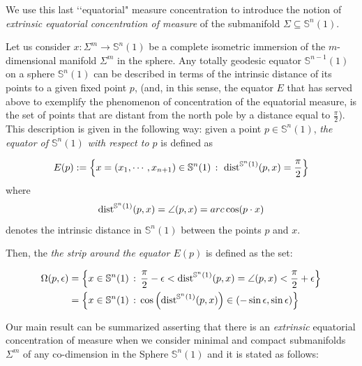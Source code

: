 \documentclass{amsart}
\theoremstyle{definition}
\theoremstyle{remark}
\begin{document}
We use this last \lq\lq equatorial" measure concentration to introduce the notion of  {\em extrinsic equatorial concentration of measure}  of the submanifold $\Sigma \subseteq \mathbb{S}^n(1)$. 

Let us consider $x: \Sigma^m \to \mathbb{S}^n(1)$ be a complete isometric immersion of the  $m$-dimensional manifold $\Sigma^m$ in the sphere. Any totally geodesic equator $\mathbb{S}^{n-1}(1)$ on a sphere  $\mathbb{S}^n(1)$ can be described in terms of the intrinsic distance of its points to a given fixed point $p$, (and, in this sense, the equator $E$ that has served above to exemplify the phenomenon of concentration of the equatorial measure, is the set of points that are distant from the north pole by a distance equal to $\frac{\pi}{2}$). This description is given in the following way: given a point $p \in \mathbb{S}^n(1)$, \emph{the equator of $\mathbb{S}^n(1)$ with respect to $p$} is defined as 
   
 $$
E(p):=\left\{x=(x_1,\cdots,x_{n+1})\in \mathbb{S}^n(1)\, :\,\,{\rm dist}^{\mathbb{S}^n(1)}(p,x)=\frac{\pi}{2} \right\}
    $$ \noindent where 
    $${\rm dist}^{\mathbb{S}^n(1)}(p,x)=\angle{(p,x)}=arc\cos(p\cdot x)$$
    \noindent  denotes the intrinsic distance in $\mathbb{S}^n(1)$ between the points $p$ and $x$. 
    
     Then, the  \emph{the strip around the equator $E(p)$} is defined as the set:
    

$$
\begin{aligned}
\Omega(p,\epsilon)&=\left\lbrace x\in \mathbb{S}^{n}(1)\, : \, \frac{\pi}{2}-\epsilon<{\rm dist}^{\mathbb{S}^{n}(1)}(p,x)=\angle{(p,x)}<\frac{\pi}{2}+\epsilon\right\rbrace\\&=\left\lbrace x\in \mathbb{S}^{n}(1)\, : \,   \cos\left({\rm dist}^{\mathbb{S}^{n}(1)}(p,x)\right)\in ( -\sin\epsilon,\sin\epsilon) \right\rbrace
\end{aligned}
$$

Our main result can be summarized asserting that there is an {\em extrinsic} equatorial concentration of measure when we consider minimal and compact submanifolds $\Sigma^m$ of any co-dimension in the Sphere $\mathbb{S}^n(1)$ and it is stated as follows:
\end{document}
